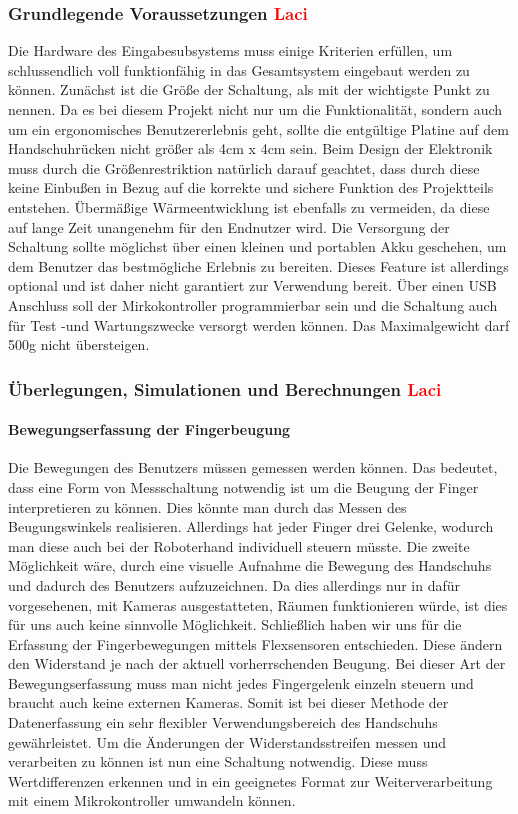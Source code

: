 \documentclass[titlepage,12pt,twoside]{article}
\begin{document}
\subsubsection{Grundlegende Voraussetzungen \textcolor{red}{Laci}}
Die Hardware des Eingabesubsystems muss einige Kriterien erfüllen, um schlussendlich voll funktionfähig in das Gesamtsystem eingebaut 
werden zu können. Zunächst ist die Größe der Schaltung, als mit der wichtigste Punkt zu nennen. Da es bei diesem Projekt nicht nur
um die Funktionalität, sondern auch um ein ergonomisches Benutzererlebnis geht, sollte die entgültige Platine auf dem Handschuhrücken
nicht größer als 4cm x 4cm sein. Beim Design der Elektronik muss durch die Größenrestriktion natürlich darauf geachtet, dass durch
diese keine Einbußen in Bezug auf die korrekte und sichere Funktion des Projektteils entstehen. Übermäßige Wärmeentwicklung ist 
ebenfalls zu vermeiden, da diese auf lange Zeit unangenehm für den Endnutzer wird. Die Versorgung der Schaltung
sollte möglichst über einen kleinen und portablen Akku geschehen, um dem Benutzer das bestmögliche Erlebnis zu bereiten. Dieses Feature ist
allerdings optional und ist daher nicht garantiert zur Verwendung bereit. Über einen USB Anschluss soll der Mirkokontroller programmierbar sein und die Schaltung
auch für Test -und Wartungszwecke versorgt werden können. Das Maximalgewicht darf 500g nicht übersteigen. \\

\subsubsection{Überlegungen, Simulationen und Berechnungen \textcolor{red}{Laci}}
\paragraph{Bewegungserfassung der Fingerbeugung}
\hfill \break
\hfill \break
Die Bewegungen des Benutzers müssen gemessen werden können. Das bedeutet, dass eine Form von Messschaltung notwendig ist um die  
Beugung der Finger interpretieren zu können. Dies könnte man durch das Messen des Beugungswinkels realisieren. Allerdings hat 
jeder Finger drei Gelenke, wodurch man diese auch bei der Roboterhand individuell steuern müsste. Die zweite Möglichkeit wäre, 
durch eine visuelle Aufnahme die Bewegung des Handschuhs und dadurch des Benutzers aufzuzeichnen. Da dies allerdings nur in dafür vorgesehenen, 
mit Kameras ausgestatteten, Räumen funktionieren würde, ist dies für uns auch keine sinnvolle Möglichkeit. Schließlich haben 
wir uns für die Erfassung der Fingerbewegungen mittels Flexsensoren entschieden. Diese ändern den Widerstand je nach der 
aktuell vorherrschenden Beugung. Bei dieser Art der Bewegungserfassung muss man nicht jedes Fingergelenk einzeln steuern und 
braucht auch keine externen Kameras. Somit ist bei dieser Methode der Datenerfassung ein sehr flexibler Verwendungsbereich 
des Handschuhs gewährleistet. Um die Änderungen der Widerstandsstreifen messen und verarbeiten zu können ist nun eine Schaltung 
notwendig. Diese muss Wertdifferenzen erkennen und in ein geeignetes Format zur Weiterverarbeitung mit einem Mikrokontroller
umwandeln können.
\\
\\
\end{document}
